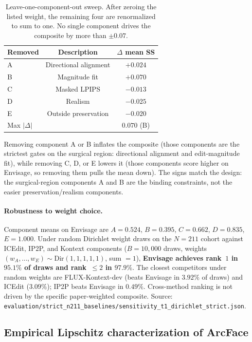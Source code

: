 \documentclass{article}
\newcommand{\method}{Envisage}
\begin{document}
\begin{table}[h]
\centering
\small
\caption{Leave-one-component-out sweep. After zeroing the listed weight, the
remaining four are renormalized to sum to one. No single component drives
the composite by more than $\pm 0.07$.}
\label{tab:loo_components}
\begin{tabular}{@{}lcc@{}}
\toprule
\textbf{Removed} & \textbf{Description} & \textbf{$\Delta$ mean SS} \\
\midrule
A & Directional alignment & $+0.024$ \\
B & Magnitude fit         & $+0.070$ \\
C & Masked LPIPS          & $-0.013$ \\
D & Realism               & $-0.025$ \\
E & Outside preservation  & $-0.020$ \\
\midrule
\multicolumn{2}{l}{Max $|\Delta|$} & $0.070$ (B) \\
\bottomrule
\end{tabular}
\end{table}

Removing component A or B inflates the composite (those components are the
strictest gates on the surgical region: directional alignment and
edit-magnitude fit), while removing C, D, or E lowers it (those components
score higher on \method{}, so removing them pulls the mean down). The signs
match the design: the surgical-region components A and B are the binding
constraints, not the easier preservation/realism components.

\paragraph{Robustness to weight choice.}
Component means on \method{} are $A{=}0.524$, $B{=}0.395$, $C{=}0.662$,
$D{=}0.835$, $E{=}1.000$. Under random Dirichlet weight draws on the
$N{=}211$ cohort against ICEdit, IP2P, and Kontext components ($B{=}10{,}000$
draws, weights $(w_A,\ldots,w_E)\sim\mathrm{Dir}(1,1,1,1,1)$, sum $=1$),
\textbf{\method{} achieves rank~$1$ in $95.1\%$ of draws and rank~$\le 2$
in $97.9\%$}. The closest competitors under random weights are
FLUX-Kontext-dev (beats \method{} in $3.92\%$ of draws) and ICEdit
($3.09\%$); IP2P beats \method{} in $0.49\%$. Cross-method ranking is
not driven by the specific paper-weighted composite. Source:
\texttt{evaluation/strict\_n211\_baselines/sensitivity\_t1\_dirichlet\_strict.json}.

\subsection{Empirical Lipschitz characterization of ArcFace}
\label{sec:lipschitz_empirical}
\end{document}
